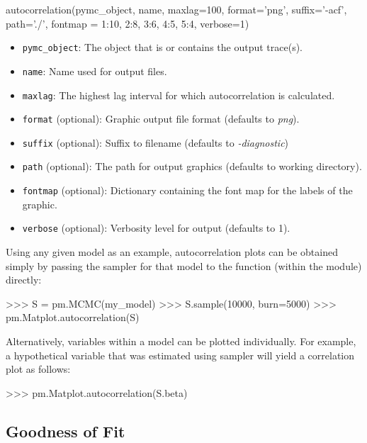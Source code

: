 \documentclass[]{jss}
\begin{document}
\begin{CodeInput}
autocorrelation(pymc_object, name, maxlag=100, format='png', suffix='-acf',
path='./', fontmap = {1:10, 2:8, 3:6, 4:5, 5:4}, verbose=1)
\end{CodeInput}
\begin{itemize}
  \item \verb=pymc_object=: The object that is or contains the output
trace(s).

  \item \verb=name=: Name used for output files.

  \item \verb=maxlag=: The highest lag interval for which
autocorrelation is calculated.

  \item \verb=format= (optional): Graphic output file format
(defaults to \emph{png}).

  \item \verb=suffix= (optional): Suffix to filename (defaults to
\emph{-diagnostic})

  \item \verb=path= (optional): The path for output graphics
(defaults to working directory).

  \item \verb=fontmap= (optional): Dictionary containing the font map
for the labels of the graphic.

  \item \verb=verbose= (optional): Verbosity level for output
(defaults to 1).
\end{itemize}

Using any given model  as an example, autocorrelation plots can be obtained simply by passing the sampler for that model to the  function (within the  module) directly:
\begin{CodeInput}
>>> S = pm.MCMC(my_model)
>>> S.sample(10000, burn=5000)
>>> pm.Matplot.autocorrelation(S)
\end{CodeInput}
Alternatively, variables within a model can be plotted individually. For example, a hypothetical variable  that was estimated using sampler  will yield a correlation plot as follows:
\begin{CodeInput}
>>> pm.Matplot.autocorrelation(S.beta)
\end{CodeInput}

\subsection{Goodness of Fit} %
\end{document}
